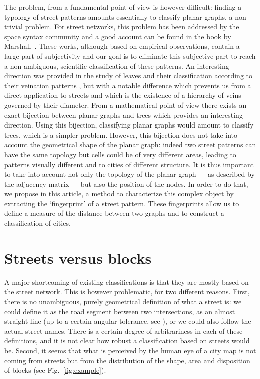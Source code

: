 The problem, from a fundamental point of view is however difficult: finding a
typology of street patterns amounts essentially to classify planar graphs, a non
trivial problem. For street networks, this problem has been addressed by the
space syntax community \cite{Hillier,Penn} and a good account can be found in
the book by Marshall~\cite{Marshall:2006}. These works, although based on
empirical observations, contain a large part of subjectivity and our goal is to
eliminate this subjective part to reach a non ambiguous, scientific
classification of these patterns. An interesting direction was provided in the
study of leaves and their classification according to their veination patterns
\cite{Katifori:2012,Weitz:2012}, but with a notable difference which prevents us
from a direct application to streets and which is the existence of a hierarchy
of veins governed by their diameter. From a mathematical point of view there
exists an exact bijection between planar graphs and trees \cite{BDG} which
provides an interesting direction. Using this bijection, classifying planar
graphs would amount to classify trees, which is a simpler problem. However, this
bijection does not take into account the geometrical shape of the planar graph:
indeed two street patterns can have the same topology but cells could be of very
different areas, leading to patterns visually different and to cities of
different structure. It is thus important to take into account not only the
topology of the planar graph --- as described by the adjacency matrix --- but
also the position of the nodes. In order to do that, we propose in this article,
a method to characterize this complex object by extracting the `fingerprint' of
a street pattern. These fingerprints allow us to define a measure of the
distance between two graphs and to construct a classification of cities.


\section{Streets versus blocks}

A major shortcoming of existing classifications  is that they are mostly based
on the street network. This is however problematic, for two different reasons.
First, there is no unambiguous, purely geometrical definition of what a street
is: we could define it as the road segment between two intersections, as an
almost straight line (up to a certain angular tolerance, see \cite{Con}), or we
could also follow the actual street names. There is a certain degree of
arbitrariness in each of these definitions, and it is not clear how robust a
classification based on streets would be. Second, it seems that what is
perceived by the human eye of a city map is not coming from streets but from the
distribution of the shape, area and disposition of blocks (see
Fig.~\ref{fig:example}). 

